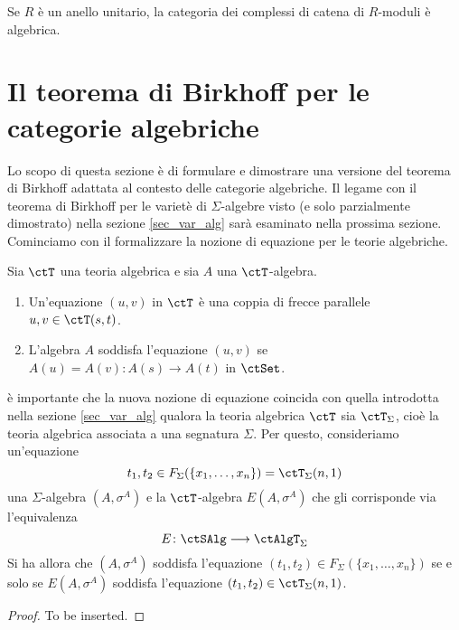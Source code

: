 \begin{example}\label{esempio_chain}
Se $R$ è un anello unitario, la categoria dei complessi di catena di $R$-moduli è algebrica.
\end{example} 

\section{Il teorema di Birkhoff per le categorie algebriche}\label{sec_th_Birkhoff}

Lo scopo di questa sezione è di formulare e dimostrare una versione del teorema di Birkhoff adattata al contesto delle 
categorie algebriche. Il legame con il teorema di Birkhoff per le varietè di $\Sigma$-algebre visto (e solo parzialmente dimostrato)
nella sezione \ref{sec_var_alg} sarà esaminato nella prossima sezione. Cominciamo con il formalizzare la nozione di equazione 
per le teorie algebriche.

\begin{definition}\label{def_equaz_th_alg}
Sia $\ctT$ una teoria algebrica e sia $A$ una $\ctT$-algebra.
\begin{enumerate}
\item Un'equazione $(u,v)$ in $\ctT$ è una coppia di frecce parallele $u,v \in \ctT(s,t)$.
\item L'algebra $A$ soddisfa l'equazione $(u,v)$ se $A(u)=A(v) \colon A(s) \to A(t)$ in $\ctSet$.
\end{enumerate}
\end{definition} 

\begin{remark}\label{oss_conf_equaz}
è importante che la nuova nozione di equazione coincida con quella introdotta nella sezione \ref{sec_var_alg} qualora la teoria algebrica
$\ctT$ sia $\ctT_{\Sigma}$, cioè la teoria algebrica associata a una segnatura $\Sigma$. Per questo, consideriamo un'equazione
\[
  t_1,t_2 \in F_{\Sigma}(\{x_1,\ldots,x_n\}) = \ctT_{\Sigma}(n,1) 
\]
una $\Sigma$-algebra $(A, \sigma^A)$ e la $\ctT$-algebra $E(A,\sigma^A)$ che gli corrisponde via l'equivalenza 
\[
  E \colon \ctSAlg \fun \ctAlgT_{\Sigma} 
\]
Si ha allora che $(A,\sigma^A)$ soddisfa l'equazione $(t_1,t_2) \in F_{\Sigma}(\{x_1,\ldots,x_n\})$ se e solo se $E(A,\sigma^A)$ soddisfa
l'equazione $(t_1,t_2) \in \ctT_{\Sigma}(n,1)$.
\end{remark}

\begin{proof}
To be inserted.
\end{proof}

